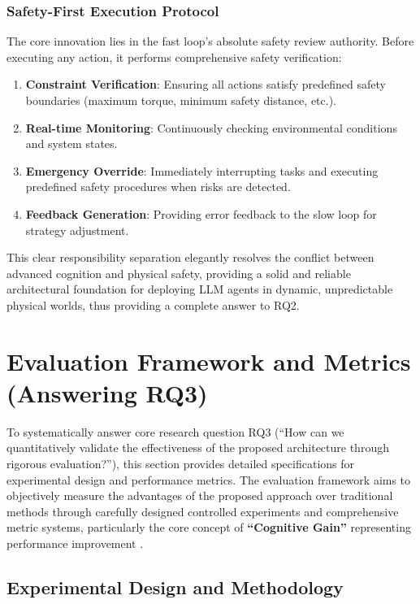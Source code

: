 \subsubsection{Safety-First Execution Protocol}

The core innovation lies in the fast loop's absolute safety review authority. Before executing any action, it performs comprehensive safety verification:

\begin{enumerate}
\item \textbf{Constraint Verification}: Ensuring all actions satisfy predefined safety boundaries (maximum torque, minimum safety distance, etc.).
\item \textbf{Real-time Monitoring}: Continuously checking environmental conditions and system states.
\item \textbf{Emergency Override}: Immediately interrupting tasks and executing predefined safety procedures when risks are detected.
\item \textbf{Feedback Generation}: Providing error feedback to the slow loop for strategy adjustment.
\end{enumerate}

This clear responsibility separation elegantly resolves the conflict between advanced cognition and physical safety, providing a solid and reliable architectural foundation for deploying LLM agents in dynamic, unpredictable physical worlds, thus providing a complete answer to RQ2.

\section{Evaluation Framework and Metrics (Answering RQ3)}

To systematically answer core research question RQ3 (``How can we quantitatively validate the effectiveness of the proposed architecture through rigorous evaluation?''), this section provides detailed specifications for experimental design and performance metrics. The evaluation framework aims to objectively measure the advantages of the proposed approach over traditional methods through carefully designed controlled experiments and comprehensive metric systems, particularly the core concept of \textbf{``Cognitive Gain''} representing performance improvement \cite{stone2016artificial}.

\subsection{Experimental Design and Methodology}

